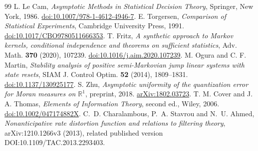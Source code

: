 \begin{thebibliography}{99}
 L. Le Cam, \emph{Asymptotic Methods in Statistical Decision Theory}, Springer, New York, 1986. \href{https://doi.org/10.1007/978-1-4612-4946-7}{doi:10.1007/978-1-4612-4946-7}.
 E. Torgersen, \emph{Comparison of Statistical Experiments}, Cambridge University Press, 1991. \href{https://doi.org/10.1017/CBO9780511666353}{doi:10.1017/CBO9780511666353}.
 T. Fritz, \emph{A synthetic approach to Markov kernels, conditional independence and theorems on sufficient statistics}, Adv. Math. \textbf{370} (2020), 107239. \href{https://doi.org/10.1016/j.aim.2020.107239}{doi:10.1016/j.aim.2020.107239}.
 M. Ogura and C. F. Martin, \emph{Stability analysis of positive semi-Markovian jump linear systems with state resets}, SIAM J. Control Optim. \textbf{52} (2014), 1809--1831. \href{https://doi.org/10.1137/130925177}{doi:10.1137/130925177}.
 S. Zhu, \emph{Asymptotic uniformity of the quantization error for Moran measures on $\mathbb R^1$}, preprint, 2018. \href{https://arxiv.org/abs/1802.03723}{arXiv:1802.03723}.
 T. M. Cover and J. A. Thomas, \emph{Elements of Information Theory}, second ed., Wiley, 2006. \href{https://doi.org/10.1002/047174882X}{doi:10.1002/047174882X}.
 C.~D. Charalambous, P.~A. Stavrou and N.~U. Ahmed, \emph{Nonanticipative rate distortion function and relations to filtering theory}, arXiv:1210.1266v3 (2013), related published version DOI:10.1109/TAC.2013.2293403.
\end{thebibliography}
